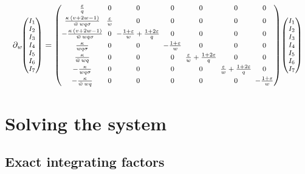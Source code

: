\documentclass[11pt]{article}
\newcommand{\eps}{\varepsilon}
\begin{document}
\begin{equation}
\partial_w\!
{\footnotesize \begin{pmatrix} I_1 \\ I_2 \\ I_3 \\ I_4 \\ I_5 \\ I_6 \\ I_7 \end{pmatrix}}
=
{\footnotesize
\setlength{\arraycolsep}{2pt}
\begin{pmatrix}
\frac{\eps}{q} & 0 & 0 & 0 & 0 & 0 & 0 \\[1.1ex]
\frac{\kappa\,(v+2w-1)}{\bar w\, w q \sigma} & \frac{\eps}{w} &
  0 & 0 & 0 & 0 & 0 \\[1.1ex]
-\frac{\kappa\,(v+2w-1)}{\bar w\, w q \sigma} & 0 &
  -\frac{1+\eps}{w}+\frac{1+2\eps}{q} & 0 & 0 & 0 & 0 \\[1.1ex]
\frac{\kappa}{w q \sigma} & 0 & 0 & -\frac{1+\eps}{w} &
  0 & 0 & 0 \\[1.1ex]
\frac{\kappa}{\bar w\, w q} & 0 & 0 & 0 &
  \frac{\eps}{w}+\frac{1+2\eps}{q} & 0 & 0 \\[1.1ex]
-\frac{\kappa}{w q \sigma} & 0 & 0 & 0 & 0 &
  \frac{\eps}{w}+\frac{1+2\eps}{q} & 0 \\[1.1ex]
-\frac{\kappa}{\bar w\, w q} & 0 & 0 & 0 & 0 & 0 &
  -\frac{1+\eps}{w}
\end{pmatrix}
}
{\footnotesize \begin{pmatrix} I_1 \\ I_2 \\ I_3 \\ I_4 \\ I_5 \\ I_6 \\ I_7 \end{pmatrix}}
\label{eq:Aw}
\end{equation}

\section{Solving the system}
\label{sec:solve}

\subsection{Exact integrating factors}
\end{document}
